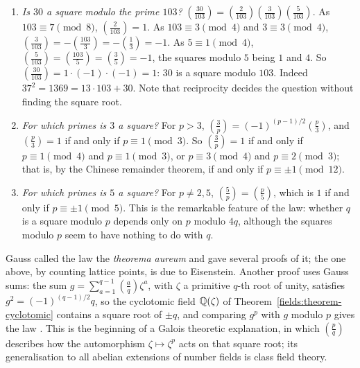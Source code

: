 \begin{example}\label{number-theory:example-reciprocity}
\begin{enumerate}
\item \emph{Is $30$ a square modulo the prime $103$?} $(\frac{30}{103}) = (\frac{2}{103})(\frac{3}{103})(\frac{5}{103})$. As $103 \equiv 7 \pmod 8$, $(\frac{2}{103}) = 1$. As $103 \equiv 3 \pmod 4$ and
$3 \equiv 3 \pmod 4$, $(\frac{3}{103}) = -(\frac{103}{3}) = -(\frac{1}{3}) = -1$. As $5 \equiv 1 \pmod 4$, $(\frac{5}{103}) = (\frac{103}{5}) = (\frac{3}{5}) = -1$, the squares modulo $5$ being $1$ and $4$.
So $(\frac{30}{103}) = 1 \cdot (-1) \cdot (-1) = 1$: $30$ is a square modulo $103$. Indeed $37^2 = 1369 = 13 \cdot 103 + 30$. Note that reciprocity decides the question without finding the square root.
\item \emph{For which primes is $3$ a square?} For $p > 3$, $(\frac{3}{p}) = (-1)^{(p-1)/2}(\frac{p}{3})$, and $(\frac{p}{3}) = 1$ if and only if $p \equiv 1 \pmod 3$. So $(\frac{3}{p}) = 1$ if and only if
$p \equiv 1 \pmod 4$ and $p \equiv 1 \pmod 3$, or $p \equiv 3 \pmod 4$ and $p \equiv 2 \pmod 3$; that is, by the Chinese remainder theorem, if and only if $p \equiv \pm1 \pmod{12}$.
\item \emph{For which primes is $5$ a square?} For $p \neq 2, 5$, $(\frac{5}{p}) = (\frac{p}{5})$, which is $1$ if and only if $p \equiv \pm1 \pmod 5$. This is the remarkable feature of the law: whether $q$
is a square modulo $p$ depends only on $p$ modulo $4q$, although the squares modulo $p$ seem to have nothing to do with $q$.
\end{enumerate}
\end{example}

\begin{remark}\label{number-theory:remark-reciprocity}
Gauss called the law the \emph{theorema aureum} and gave several proofs of it; the one above, by counting lattice points, is due to Eisenstein. Another proof uses Gauss sums: the sum
$g = \sum_{a=1}^{q-1}(\frac{a}{q})\zeta^a$, with $\zeta$ a primitive $q$-th root of unity, satisfies $g^2 = (-1)^{(q-1)/2}q$, so the cyclotomic field $\mathbb{Q}(\zeta)$ of
Theorem~\ref{fields:theorem-cyclotomic} contains a square root of $\pm q$, and comparing $g^p$ with $g$ modulo $p$ gives the law \cite{ireland-rosen}. This is the beginning of a Galois theoretic
explanation, in which $(\frac{p}{q})$ describes how the automorphism $\zeta \mapsto \zeta^p$ acts on that square root; its generalisation to all abelian extensions of number fields is class field
theory.
\end{remark}

